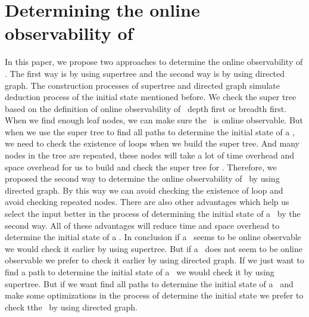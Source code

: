 \section{Determining the online observability of \BCNs}
\label{sec:deter}
In this paper, we propose two approaches to determine the online observability of \BCNs. The first way is by using supertree and the second way is by using directed graph. The construction processes of supertree and directed graph simulate deduction process of the initial state mentioned before. We check the super tree based on the definition of online observability of \BCNs\ depth first or breadth first. When we find enough leaf nodes, we can make sure the \BCN\ is online observable. But when we use the super tree to find all paths to determine the initial state of a \BCN, we need to check the existence of loops when we build the super tree. And many nodes in the tree are repeated, these nodes will take a lot of time overhead and space overhead for us to build and check the super tree for \BCNs. Therefore, we proposed the second way to determine the online observability of \BCNs\ by using directed graph. By this way we can avoid checking the existence of loop and avoid checking repeated nodes. There are also other advantages which help us select the input better in the process of determining the initial state of a \BCN\ by the second way. All of these advantages will reduce time and space overhead to determine the initial state of a \BCN. In conclusion if a \BCN\ seems to be online observable we would check it earlier by using supertree. But if a  \BCN\ does not seem to be online observable we prefer to check it earlier by using directed graph. If we just want to find a path to determine the initial state of a \BCN\ we would check it by using supertree. But if we want find all paths to determine the initial state of a \BCN\ and make some optimizations in the process of determine the initial state we prefer to check tthe \BCN\ by using directed graph.

